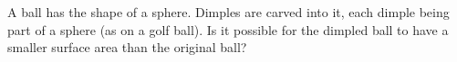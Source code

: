 A ball has the shape of a sphere. Dimples are carved into it, each dimple being part of a sphere (as on a golf ball). Is it possible for the dimpled ball to have a smaller surface area than the original ball?

